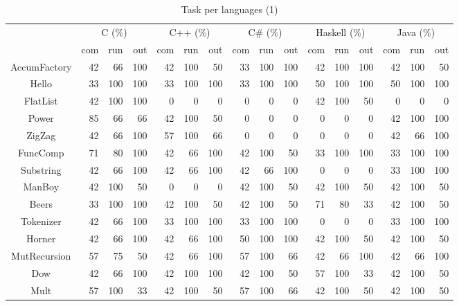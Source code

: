 \documentclass[10pt]{sigplanconf}
\begin{document}
\begin{table*}
\begin{center}
\caption{Task per languages (1)}
\label{tbl:lang-per-task-one}
\begin{tabular}{ c r r r r r r r r r r r r r r r }
\hline
 & \multicolumn{3}{c}{C (\%)} & \multicolumn{3}{c}{C++ (\%)} & \multicolumn{3}{c}{C\# (\%)} & \multicolumn{3}{c}{Haskell (\%)} & \multicolumn{3}{c}{Java (\%)}\\
 & com & run & out & com & run & out & com & run & out & com & run & out & com & run & out \\
\hline
AccumFactory &  42 & 66 & 100 & 42 & 100 & 50 & 33 & 100 & 100 & 42 & 100 & 100 & 42 & 100 & 50 \\
Hello &  33 & 100 & 100 & 33 & 100 & 100 & 33 & 100 & 100 & 50 & 100 & 100 & 50 & 100 & 100 \\
FlatList &  42 & 100 & 100 & 0 & 0 & 0 & 0 & 0 & 0 & 42 & 100 & 50 & 0 & 0 & 0 \\
Power &  85 & 66 & 66 & 42 & 100 & 50 & 0 & 0 & 0 & 0 & 0 & 0 & 42 & 100 & 100 \\
ZigZag &  42 & 66 & 100 & 57 & 100 & 66 & 0 & 0 & 0 & 0 & 0 & 0 & 42 & 66 & 100 \\
FuncComp &  71 & 80 & 100 & 42 & 66 & 100 & 42 & 100 & 50 & 33 & 100 & 100 & 33 & 100 & 100 \\
Substring &  42 & 66 & 100 & 42 & 66 & 100 & 42 & 66 & 100 & 0 & 0 & 0 & 33 & 100 & 100 \\
ManBoy &  42 & 100 & 50 & 0 & 0 & 0 & 42 & 100 & 50 & 42 & 100 & 50 & 42 & 100 & 50 \\
Beers &  33 & 100 & 100 & 42 & 100 & 50 & 42 & 100 & 50 & 71 & 80 & 33 & 42 & 100 & 50 \\
Tokenizer &  42 & 66 & 100 & 33 & 100 & 100 & 33 & 100 & 100 & 0 & 0 & 0 & 33 & 100 & 100 \\
Horner &  42 & 66 & 100 & 42 & 66 & 100 & 50 & 100 & 100 & 42 & 100 & 50 & 42 & 100 & 50 \\
MutRecursion &  57 & 75 & 50 & 42 & 66 & 100 & 57 & 100 & 66 & 42 & 66 & 100 & 42 & 66 & 100 \\
Dow &  42 & 66 & 100 & 42 & 100 & 100 & 42 & 100 & 50 & 57 & 100 & 33 & 42 & 100 & 50 \\
Mult &  57 & 100 & 33 & 42 & 100 & 50 & 57 & 100 & 66 & 42 & 100 & 50 & 42 & 100 & 50 \\
\hline
\end{tabular}
\end{center}
\end{table*}
\end{document}
